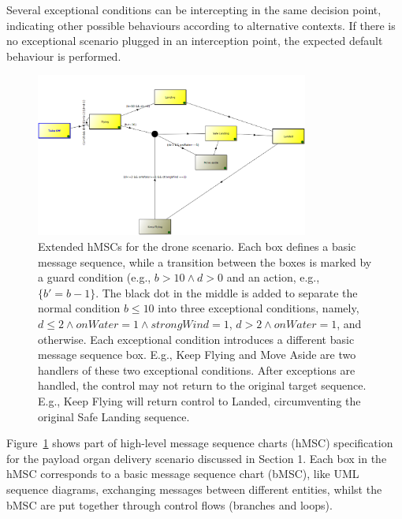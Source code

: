 Several exceptional conditions can be intercepting in the same decision point, indicating other possible behaviours according to alternative contexts. If there is no exceptional scenario plugged in an interception point, the expected default behaviour is performed.
\begin{figure}[h]\centering
 \includegraphics[width=0.8\textwidth]{figures/1-hMSC-Drone.png}
    \caption{Extended hMSCs for the drone scenario. Each box defines a basic message sequence, while a transition between the boxes is marked by a guard condition (e.g., $b>10 \wedge d>0$ and an action, e.g., $\{ b'=b-1\}$. The black dot in the middle is added to separate the normal condition $b\leq 10$ into three exceptional conditions, namely, $d\leq 2 \wedge onWater=1 \wedge strongWind=1$, $d>2 \wedge onWater=1$, and otherwise. Each exceptional condition introduces a different basic message sequence box. 
E.g., Keep Flying and Move Aside are two handlers of these two exceptional conditions. After exceptions are handled, the control may not return to the original target sequence. E.g., Keep Flying will return control to Landed, circumventing the original Safe Landing sequence. }
    \label{fig:hmsc}
    \vspace*{-0.25cm}
\end{figure}

Figure~\ref{fig:hmsc} shows part of high-level message sequence charts (hMSC) specification for the payload organ delivery scenario discussed in Section 1. Each box in the hMSC corresponds to a basic message sequence chart (bMSC), like UML sequence diagrams, exchanging messages between different entities, whilst the bMSC are put together through control flows (branches and loops). 

